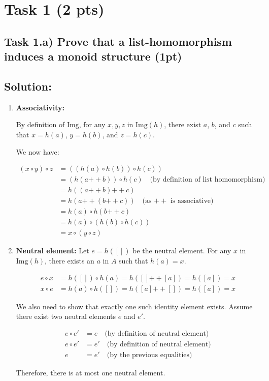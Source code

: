 \documentclass{article}
\begin{document}
\section{Task 1 (2 pts)}

\subsection{Task 1.a) Prove that a list-homomorphism induces a monoid structure (1pt)}

\subsection*{Solution:}

\begin{enumerate}
    \item \textbf{Associativity:}

    By definition of $\text{Img}$, for any $x, y, z$ in $\text{Img}(h)$, there exist $a$, $b$, and $c$ such that $x = h(a)$, $y = h(b)$, and $z = h(c)$. 

    We now have:

    \begin{align*}
    (x \circ y) \circ z &= ((h(a) \circ h(b)) \circ h(c)) \\
    &= (h(a \mathbin{++} b)) \circ h(c) \quad \text{(by definition of list homomorphism)} \\
    &= h((a \mathbin{++} b) \mathbin{++} c) \\
    &= h(a \mathbin{++} (b \mathbin{++} c)) \quad \text{(as $\mathbin{++}$ is associative)} \\
    &= h(a) \circ h(b \mathbin{++} c) \\
    &= h(a) \circ (h(b) \circ h(c)) \\
    &= x \circ (y \circ z)
    \end{align*}

    \item \textbf{Neutral element:}
    Let $e = h([])$ be the neutral element. 
    For any $x$ in $\text{Img}(h)$, there exists an $a$ in $A$ such that $h(a) = x$.

    \begin{align*}
    e \circ x &= h([]) \circ h(a) = h([] \mathbin{++} [a]) = h([a]) = x \\
    x \circ e &= h(a) \circ h([]) = h([a] \mathbin{++} []) = h([a]) = x
    \end{align*}

    We also need to show that exactly one such identity element exists.
    Assume there exist two neutral elements $e$ and $e'$.

    \begin{align*}
    e \circ e' &= e \quad \text{(by definition of neutral element)} \\
    e \circ e' &= e' \quad \text{(by definition of neutral element)} \\
    e &= e' \quad \text{(by the previous equalities)}
    \end{align*}

    Therefore, there is at most one neutral element.
\end{enumerate}
\end{document}
